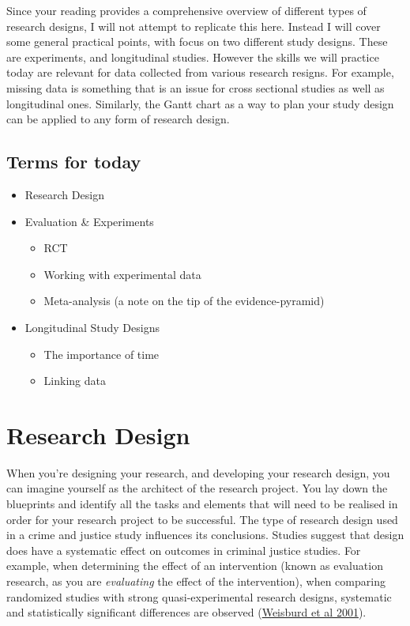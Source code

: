 \documentclass[]{book}
\providecommand{\tightlist}{%
  \setlength{\itemsep}{0pt}\setlength{\parskip}{0pt}}
\theoremstyle{definition}
\theoremstyle{definition}
\theoremstyle{definition}
\theoremstyle{remark}
\begin{document}
Since your reading provides a comprehensive overview of different types
of research designs, I will not attempt to replicate this here. Instead
I will cover some general practical points, with focus on two different
study designs. These are experiments, and longitudinal studies. However
the skills we will practice today are relevant for data collected from
various research resigns. For example, missing data is something that is
an issue for cross sectional studies as well as longitudinal ones.
Similarly, the Gantt chart as a way to plan your study design can be
applied to any form of research design.

\hypertarget{terms-for-today-3}{%
\subsection{Terms for today}\label{terms-for-today-3}}

\begin{itemize}
\tightlist
\item
  Research Design
\item
  Evaluation \& Experiments

  \begin{itemize}
  \tightlist
  \item
    RCT
  \item
    Working with experimental data
  \item
    Meta-analysis (a note on the tip of the evidence-pyramid)
  \end{itemize}
\item
  Longitudinal Study Designs

  \begin{itemize}
  \tightlist
  \item
    The importance of time
  \item
    Linking data
  \end{itemize}
\end{itemize}

\hypertarget{research-design}{%
\section{Research Design}\label{research-design}}

When you're designing your research, and developing your research
design, you can imagine yourself as the architect of the research
project. You lay down the blueprints and identify all the tasks and
elements that will need to be realised in order for your research
project to be successful. The type of research design used in a crime
and justice study influences its conclusions. Studies suggest that
design does have a systematic effect on outcomes in criminal justice
studies. For example, when determining the effect of an intervention
(known as evaluation research, as you are \emph{evaluating} the effect
of the intervention), when comparing randomized studies with strong
quasi-experimental research designs, systematic and statistically
significant differences are observed
(\href{http://cebcp.org/wp-content/publications/Does\%20Research\%20Design\%20Affect\%20Study\%20Outcomes.pdf}{Weisburd
et al 2001}).
\end{document}
